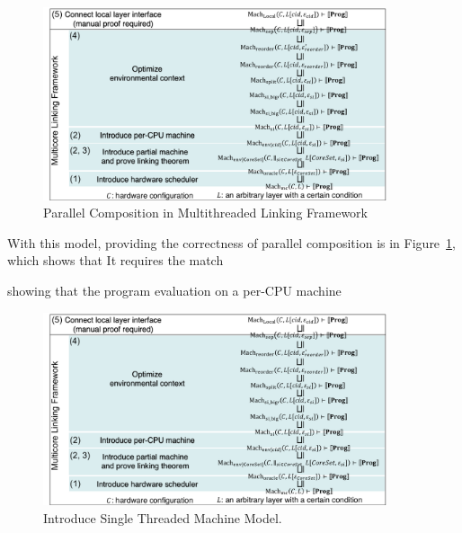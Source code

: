 \begin{figure}
\begin{center}
\includegraphics[width=0.9\textwidth, page=6]{figs/conlink/concurrent_linking}
\end{center}
\caption{Parallel Composition in Multithreaded Linking Framework}
\label{fig:chapter:conlink:parallel-composition-in-easm}
\end{figure}

With this model, 
providing the correctness of parallel composition is in Figure~\ref{fig:chapter:conlink:parallel-composition-in-easm},
which shows that 
It requires the match 


showing that the program evaluation on a per-CPU machine 









\begin{figure}
\begin{center}
\includegraphics[width=0.9\textwidth, page=7]{figs/conlink/concurrent_linking}
\end{center}
\caption{Introduce Single Threaded Machine Model.}
\label{fig:chapter:conlink:introduce-single-threaded-machine-model-with-iiasm}
\end{figure}



